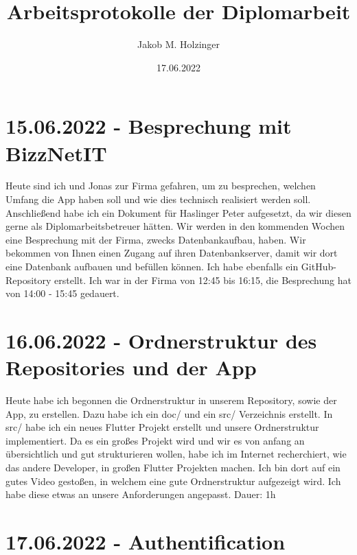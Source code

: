 \documentclass[letterpaper,10pt]{article}
\title{Arbeitsprotokolle der Diplomarbeit}
\date{17.06.2022}
\author{Jakob M. Holzinger}
\begin{document}
\maketitle
\frenchspacing
\raggedbottom
\pagestyle{plain}
\section{15.06.2022 - Besprechung mit BizzNetIT}
Heute sind ich und Jonas zur Firma gefahren, um zu besprechen, welchen Umfang die App haben soll und wie dies technisch realisiert werden soll. Anschließend habe ich ein Dokument für Haslinger Peter aufgesetzt, da wir diesen gerne als Diplomarbeitsbetreuer hätten. Wir werden in den kommenden Wochen eine Besprechung mit der Firma, zwecks Datenbankaufbau, haben. Wir bekommen von Ihnen einen Zugang auf ihren Datenbankserver, damit wir dort eine Datenbank aufbauen und befüllen können. Ich habe ebenfalls ein GitHub-Repository erstellt. Ich war in der Firma von 12:45 bis 16:15, die Besprechung hat von 14:00 - 15:45 gedauert.
\section{16.06.2022 - Ordnerstruktur des Repositories und der App}
Heute habe ich begonnen die Ordnerstruktur in unserem Repository, sowie der App, zu erstellen. Dazu habe ich ein doc/ und ein src/ Verzeichnis erstellt. In src/ habe ich ein neues Flutter Projekt erstellt und unsere Ordnerstruktur implementiert. Da es ein großes Projekt wird und wir es von anfang an übersichtlich und gut strukturieren wollen, habe ich im Internet recherchiert, wie das andere Developer, in großen Flutter Projekten machen. Ich bin dort auf ein gutes Video \cite{file-structure} gestoßen, in welchem eine gute Ordnerstruktur aufgezeigt wird. Ich habe diese etwas an unsere Anforderungen angepasst. Dauer: 1h
\section{17.06.2022 - Authentification}
\printbibliography
\end{document}
